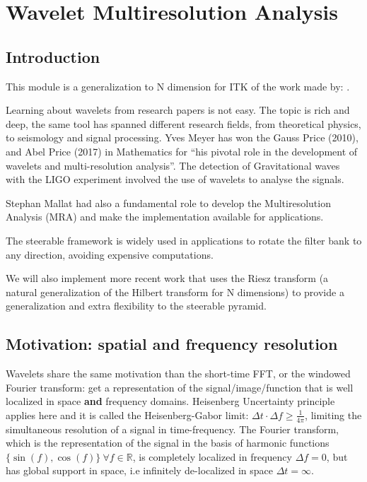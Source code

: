 \section{Wavelet Multiresolution Analysis}
\label{sec:first}

\subsection{Introduction}
\label{sub:introduction}
This module is a generalization to N dimension for ITK of the work made by: \cite{freeman_design_1991, simoncelli_steerable_1995, kovesi_image_1999, held_steerable_2010,chenouard_3d_2012, unser_steerable_2011, pad_vow:_2014}.

Learning about wavelets from research papers is not easy. The topic is rich and deep, the same tool has spanned different research fields, from theoretical physics, to seismology and signal processing.
Yves Meyer has won the Gauss Price (2010), and Abel Price (2017) in Mathematics for ``his pivotal role in the development of wavelets and multi-resolution analysis''. The detection of Gravitational waves with the LIGO experiment involved the use of wavelets to analyse the signals.

Stephan Mallat \cite{mallat_theory_1989} had also a fundamental role to develop the Multiresolution Analysis (MRA) and make the implementation available for applications.

The steerable framework \cite{freeman_design_1991, simoncelli_steerable_1995} is widely used in applications to rotate the filter bank to any direction, avoiding expensive computations.

We will also implement more recent work \cite{held_steerable_2010, unser_steerable_2011, chenouard_3d_2012} that uses the Riesz transform (a natural generalization of the Hilbert transform for N dimensions) to provide a generalization and extra flexibility to the steerable pyramid.

\subsection{Motivation: spatial and frequency resolution}
\label{sub:Motivation}
Wavelets share the same motivation than the short-time FFT, or the windowed Fourier transform: get a representation of the signal/image/function that is well localized in space \textbf{and} frequency domains. Heisenberg Uncertainty principle applies here and it is called the Heisenberg-Gabor limit: $\Delta t \cdot \Delta f \geq \frac{1}{4\pi}$, limiting the simultaneous resolution of a signal in time-frequency.
The Fourier transform, which is the representation of the signal in the basis of harmonic functions $\{\sin(f),\cos(f)\}\ \forall f \in \mathbb{R}$, is completely localized in frequency $\Delta f = 0$, but has global support in space, i.e infinitely de-localized in space $\Delta t = \infty$.

